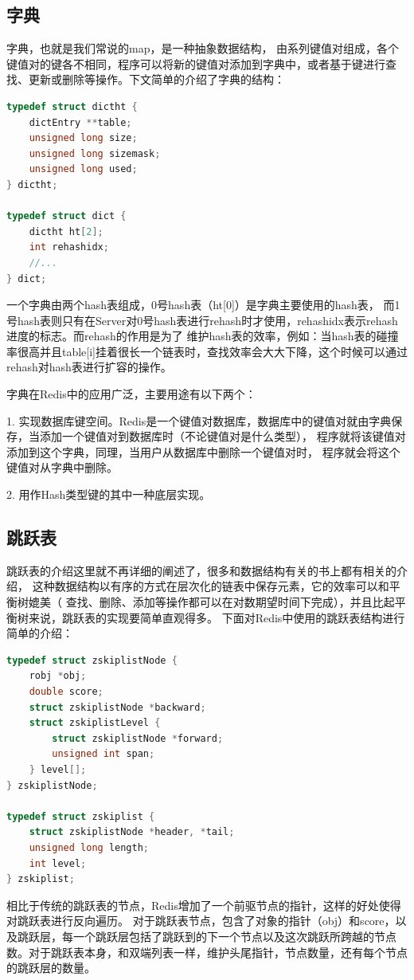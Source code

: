 \documentclass{zjutthesis}
\begin{document}
\subsection{字典}
字典\cite{macedo2011redis}，也就是我们常说的map，是一种抽象数据结构， 由系列键值对组成，各个键值对的键各不相同，程序可以将新的键值对添加到字典中，或者基于键进行查找、更新或删除等操作。下文简单的介绍了字典的结构：
\begin{lstlisting}[language=C]
typedef struct dictht {
    dictEntry **table;
    unsigned long size;
    unsigned long sizemask;
    unsigned long used;
} dictht;

typedef struct dict {
    dictht ht[2];
    int rehashidx;
    //...
} dict;
\end{lstlisting}
一个字典由两个hash表组成，0号hash表（ht[0]）是字典主要使用的hash表， 而1号hash表则只有在Server对0号hash表进行rehash时才使用，rehashidx表示rehash进度的标志。而rehash的作用是为了
维护hash表的效率，例如：当hash表的碰撞率很高并且table[i]挂着很长一个链表时，查找效率会大大下降，这个时候可以通过rehash对hash表进行扩容的操作。

字典在Redis中的应用广泛，主要用途有以下两个：

1. 实现数据库键空间。Redis是一个键值对数据库，数据库中的键值对就由字典保存，当添加一个键值对到数据库时（不论键值对是什么类型）， 程序就将该键值对添加到这个字典，同理，当用户从数据库中删除一个键值对时， 程序就会将这个键值对从字典中删除。

2. 用作Hash类型键的其中一种底层实现。

\subsection{跳跃表}
跳跃表\cite{weiss2004}的介绍这里就不再详细的阐述了，很多和数据结构有关的书上都有相关的介绍， 这种数据结构以有序的方式在层次化的链表中保存元素，它的效率可以和平衡树\cite{ref:18}媲美（ 查找、删除、添加等操作都可以在对数期望时间下完成），并且比起平衡树来说，跳跃表的实现要简单直观得多。
下面对Redis中使用的跳跃表结构进行简单的介绍：
\begin{lstlisting}[language=C]
typedef struct zskiplistNode {
    robj *obj;
    double score;
    struct zskiplistNode *backward;
    struct zskiplistLevel {
        struct zskiplistNode *forward;
        unsigned int span;
    } level[];
} zskiplistNode;

typedef struct zskiplist {
    struct zskiplistNode *header, *tail;
    unsigned long length;
    int level;
} zskiplist;
\end{lstlisting}
相比于传统的跳跃表的节点，Redis增加了一个前驱节点的指针，这样的好处使得对跳跃表进行反向遍历。
对于跳跃表节点，包含了对象的指针（obj）和score，以及跳跃层，每一个跳跃层包括了跳跃到的下一个节点以及这次跳跃所跨越的节点数。对于跳跃表本身，和双端列表一样，维护头尾指针，节点数量，还有每个节点的跳跃层的数量。
\end{document}
